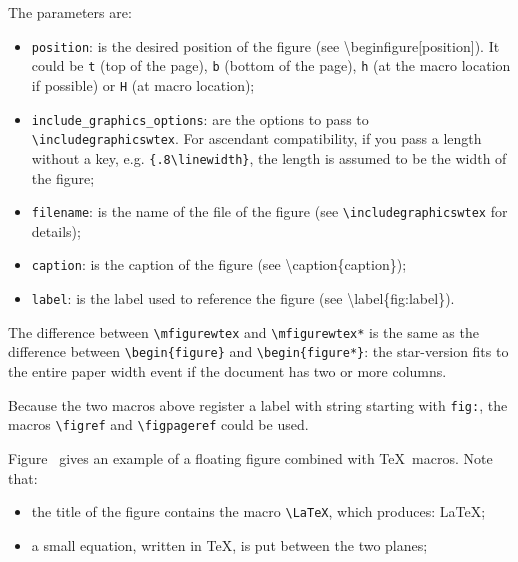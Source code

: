\documentclass[book,taskpackage,specpackage,codepackage]{upmethodology-document}
\begin{document}
The parameters are:
\begin{itemize}
\item \texttt{position}: is the desired position of the figure (see {\textbackslash}begin{figure}[position]). It could be \texttt{t} (top of the page), \texttt{b} (bottom of the page), \texttt{h} (at the macro location if possible) or \texttt{H} (at macro location);

\item \texttt{include\_graphics\_options}: are the options to pass to \texttt{{\textbackslash}includegraphicswtex}. For ascendant compatibility, if you pass a length without a key, e.g. \texttt{\{.8{\textbackslash}linewidth\}}, the length is assumed to be the width of the figure;

\item \texttt{filename}: is the name of the file of the figure (see \texttt{{\textbackslash}includegraphicswtex} for details);

\item \texttt{caption}: is the caption of the figure (see {\textbackslash}caption\{caption\});

\item \texttt{label}: is the label used to reference the figure (see {\textbackslash}label\{fig:label\}).
\end{itemize}

The difference between \texttt{{\textbackslash}mfigurewtex} and \texttt{{\textbackslash}mfigurewtex*} is the same as the difference between \texttt{{\textbackslash}begin\{figure\}} and \texttt{{\textbackslash}begin\{figure*\}}: the star-version fits to the entire paper width event if the document has two or more columns.

Because the two macros above register a label with string starting with \texttt{fig:}, the macros \texttt{{\textbackslash}figref} and \texttt{{\textbackslash}figpageref} could be used.


Figure~ gives an example of a floating figure combined with \TeX\ macros. Note that:
\begin{itemize}
\item the title of the figure contains the macro \texttt{{\textbackslash}LaTeX}, which produces: \LaTeX;
\item a small equation, written in \TeX, is put between the two planes;
\end{itemize}
\end{document}
